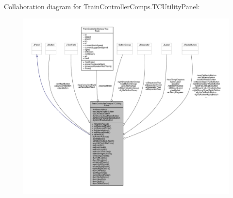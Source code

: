 Collaboration diagram for Train\+Controller\+Comps.\+T\+C\+Utility\+Panel\+:
\nopagebreak
\begin{figure}[H]
\begin{center}
\leavevmode
\includegraphics[width=350pt]{classTrainControllerComps_1_1TCUtilityPanel__coll__graph}
\end{center}
\end{figure}
